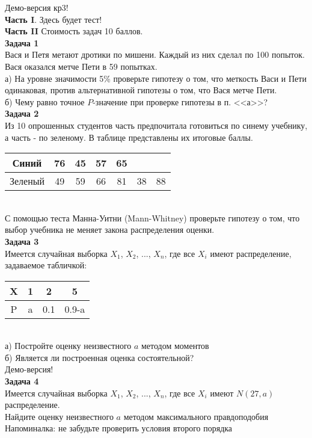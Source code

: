 \documentclass[pdftex,12pt,a4paper]{article}
\begin{document}
Демо-версия кр3! \\
\textbf{Часть I}. Здесь будет тест! \\
\textbf{Часть II} Стоимость задач 10 баллов. \\

\textbf{Задача 1} \\ 
Вася и Петя метают дротики по мишени. Каждый из них сделал
по 100 попыток. Вася оказался метче Пети в 59 попытках. \\
а) На уровне
значимости 5\% проверьте гипотезу о том, что меткость Васи и Пети
одинаковая, против альтернативной гипотезы о том, что Вася метче
Пети. \\
б) Чему равно точное $P$-значение при проверке гипотезы в п. <<а>>? \\

\textbf{Задача 2} \\ %
Из 10 опрошенных студентов часть предпочитала готовиться по
синему учебнику, а часть - по зеленому. В таблице представлены их
итоговые баллы.  \\
\begin{tabular}{|c|c|c|c|c|c|c|}
  \hline
  Синий & 76 & 45 & 57 & 65 &  &  \\
  \hline
  Зеленый & 49 & 59 & 66 & 81 & 38 & 88 \\
  \hline
\end{tabular} \\
С помощью теста Манна-Уитни (Mann-Whitney) проверьте гипотезу о
том, что выбор учебника не меняет закона распределения оценки. \\

\textbf{Задача 3} \\ %
Имеется случайная выборка $X_{1}$, $X_{2}$, ..., $X_{n}$, где все $X_{i}$ имеют распределение, задаваемое табличкой: \\
\begin{tabular}{|c|c|c|c|}
\hline 
X & 1 & 2 & 5 \\ 
\hline 
P & a & 0.1 & 0.9-a \\ 
\hline 
\end{tabular} \\
а) Постройте оценку неизвестного $a$ методом моментов \\
б) Является ли построенная оценка состоятельной? \\

Демо-версия! \\

\textbf{Задача 4} \\ %
Имеется случайная выборка $X_{1}$, $X_{2}$, ..., $X_{n}$, где все $X_{i}$ имеют $N(27,a)$ распределение. \\
Найдите оценку неизвестного $a$ методом максимального правдоподобия \\
Напоминалка: не забудьте проверить условия второго порядка \\
\end{document}
